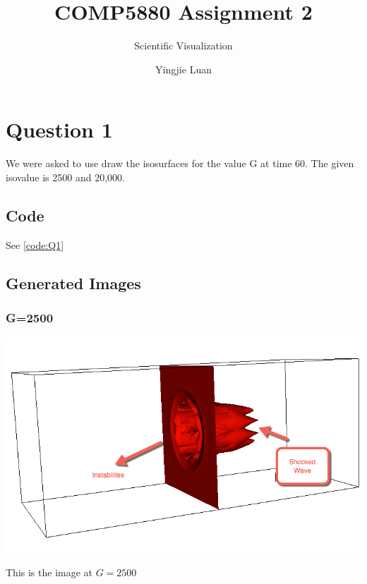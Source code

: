 \documentclass[11pt]{scrartcl}
\begin{document}
\title{COMP5880 Assignment 2}
\subtitle{ Scientific Visualization}
\author{Yingjie Luan}
\maketitle

\tableofcontents

\section{Question 1}
We were asked to use draw the isosurfaces for the value G at time 60. The given isovalue is 2500 and 20,000.

\subsection{Code}
See \ref{code:Q1}

\subsection{Generated Images}

\subsubsection{G=2500}
\begin{minipage}[t]{\linewidth}
{
\includegraphics[scale = 0.6]{img_1_2500.png}

\centering
\medskip
{\footnotesize This is the image at $G = 2500$}
}
\end{minipage}
\end{document}
